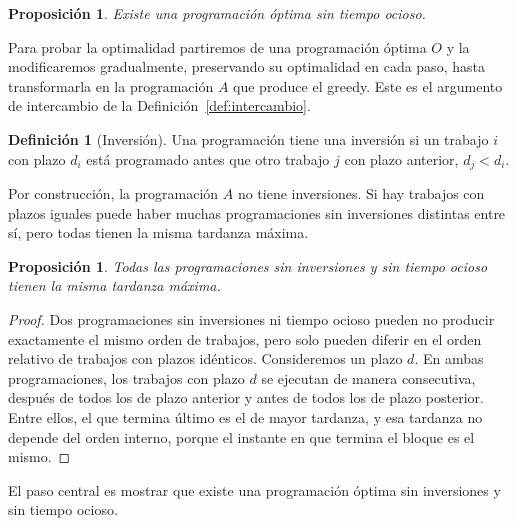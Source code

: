 \documentclass[12pt, spanish, oneside, openany]{book}
\theoremstyle{uprightplain}
\newtheorem{proposicion}[teorema]{Proposición}
\theoremstyle{definition}
\newtheorem{definicion}[teorema]{Definición}
\theoremstyle{remark}
\theoremstyle{definition}
\begin{document}
\begin{proposicion}
\label{prop:sin-ocio}
Existe una programación óptima sin tiempo ocioso.
\end{proposicion}

Para probar la optimalidad partiremos de una programación óptima $O$ y la modificaremos gradualmente, preservando su optimalidad en cada paso, hasta transformarla en la programación $A$ que produce el greedy. Este es el argumento de intercambio de la Definición~\ref{def:intercambio}.

\begin{definicion}[Inversión]
\label{def:inversion}
Una programación tiene una inversión si un trabajo $i$ con plazo $d_i$ está programado antes que otro trabajo $j$ con plazo anterior, $d_j<d_i$.
\end{definicion}

Por construcción, la programación $A$ no tiene inversiones. Si hay trabajos con plazos iguales puede haber muchas programaciones sin inversiones distintas entre sí, pero todas tienen la misma tardanza máxima.

\begin{proposicion}
\label{prop:sin-inversiones-igual}
Todas las programaciones sin inversiones y sin tiempo ocioso tienen la misma tardanza máxima.
\end{proposicion}
\begin{proof}
Dos programaciones sin inversiones ni tiempo ocioso pueden no producir exactamente el mismo orden de trabajos, pero solo pueden diferir en el orden relativo de trabajos con plazos idénticos. Consideremos un plazo $d$. En ambas programaciones, los trabajos con plazo $d$ se ejecutan de manera consecutiva, después de todos los de plazo anterior y antes de todos los de plazo posterior. Entre ellos, el que termina último es el de mayor tardanza, y esa tardanza no depende del orden interno, porque el instante en que termina el bloque es el mismo.
\end{proof}

El paso central es mostrar que existe una programación óptima sin inversiones y sin tiempo ocioso.
\end{document}
